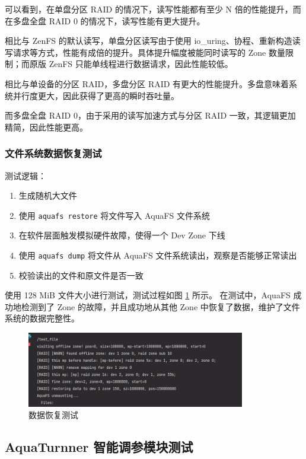 可以看到，在单盘分区 RAID 的情况下，读写性能都有至少 N 倍的性能提升，而在多盘全盘 RAID 0 的情况下，读写性能有更大提升。

相比与 ZenFS 的默认读写，单盘分区读写由于使用 io\_uring、协程、重新构造读写请求等方式，性能有成倍的提升。具体提升幅度被能同时读写的 Zone 数量限制；而原版 ZenFS 只能单线程进行数据请求，因此性能较低。

相比与单设备的分区 RAID，多盘分区 RAID 有更大的性能提升。多盘意味着系统并行度更大，因此获得了更高的瞬时吞吐量。

而多盘全盘 RAID 0，由于采用的读写加速方式与分区 RAID 一致，其逻辑更加精简，因此性能更高。

\subsubsection{文件系统数据恢复测试}

测试逻辑：

\begin{enumerate}
  \item 生成随机大文件
  \item 使用 \verb|aquafs restore| 将文件写入 AquaFS 文件系统
  \item 在软件层面触发模拟硬件故障，使得一个 Dev Zone 下线
  \item 使用 \verb|aquafs dump| 将文件从 AquaFS 文件系统读出，观察是否能够正常读出
  \item 校验读出的文件和原文件是否一致
\end{enumerate}

使用 128 MiB 文件大小进行测试，测试过程如图 \ref{test-recovery} 所示。
在测试中，AquaFS 成功地检测到了 Zone 的故障，并且成功地从其他 Zone 中恢复了数据，维护了文件系统的数据完整性。

\begin{figure}[htbp]
  \centering
  \includegraphics[width=0.85\textwidth]{fig/test-recovery.png}
  \caption{ 数据恢复测试 }
  \label{test-recovery}
\end{figure}

\subsection{AquaTurnner 智能调参模块测试}

